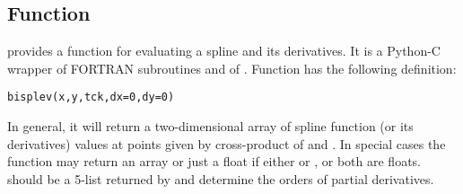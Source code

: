\subsection{Function }
\label{sec:bisplev}

 provides a function  for evaluating a
spline and its derivatives. It is a Python-C wrapper of FORTRAN
subroutines  and  of
. Function  has the following definition:
\begin{verbatim}
bisplev(x,y,tck,dx=0,dy=0)
\end{verbatim}
In general, it will return a two-dimensional array of spline function
(or its derivatives) values at points given by cross-product of
 and . In special cases the function may return an
array or just a float if either  or , or both are
floats.  should be a 5-list returned by  and
 determine the orders of partial derivatives. 

